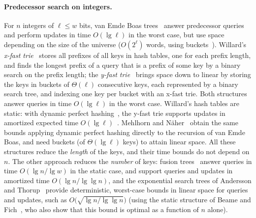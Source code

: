\documentclass[a4paper]{article}
\newcommand{\?}{\mskip1.5mu}
\begin{document}
\paragraph{Predecessor search on integers.} For $n$ integers of $\ell\leq w$ bits, van Emde Boas 
trees~\cite{vanEmdeBoas1975Preserving,EKZDIEPQ} answer predecessor queries and perform updates in time $O(\lg \ell)$ in the worst case, 
but use space depending on the size of the universe ($O(2^\ell)$ words, using buckets~\cite{vanEmdeBoas1977Preserving}). 
Willard's \emph{x-fast trie}~\cite{WilLLWRQ} 
stores all prefixes of all keys in hash tables, one for each prefix length, and finds 
the longest prefix of a query that is a prefix of some key by a binary search on the prefix length; 
the \emph{y-fast trie}~\cite{WilLLWRQ} brings space down to linear by storing the keys in buckets of 
$\Theta(\ell)$ consecutive keys, each represented by a binary search tree, and indexing one key per bucket with an x-fast trie. 
Both structures answer queries in time $O(\lg\ell)$ in the worst case. Willard's hash tables are static: 
with dynamic perfect hashing~\cite{DKMDPHULB}, the y-fast trie supports updates in amortized expected time $O(\lg\ell)$~\cite{FrWSITBFT}. 
Mehlhorn and N\"aher~\cite{MeNBOD} obtain the same bounds applying dynamic perfect hashing directly to the recursion of 
van Emde Boas, and need buckets (of $\Theta(\lg\ell)$ keys) to attain linear space. 
All these structures reduce the \emph{length} of the keys, 
and their time bounds do not depend on $n$. The other approach reduces the \emph{number} of keys: fusion
trees~\cite{FrWSITBFT} answer queries in time $O(\lg n/\lg w)$ in the static case, and support queries and updates in 
amortized time $O(\lg n/\lg\lg n)$, and the exponential search trees of 
Andersson and Thorup~\cite{AnTDOSEST} provide deterministic, worst-case bounds in linear space for
queries and updates, such as $O\bigl(\sqrt{\lg n/\lg\lg n}\bigr)$ (using the static structure of Beame and Fich~\cite{Beame2002Optimal}, who also show that this bound is optimal as a function of $n$ alone).
\end{document}
